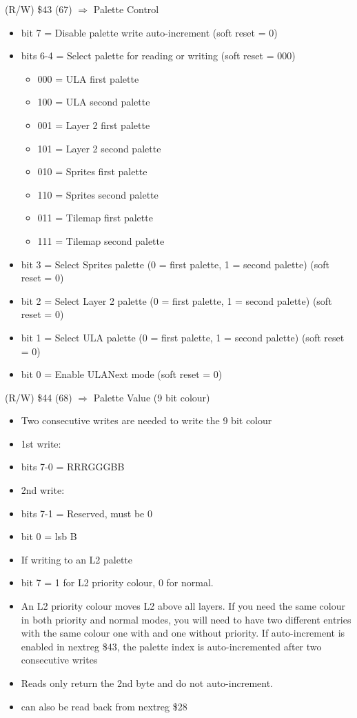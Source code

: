 (R/W) \$43 (67) $\Rightarrow$ Palette Control
\begin{itemize}
\item bit 7 = Disable palette write auto-increment (soft reset = 0)
\item bits 6-4 = Select palette for reading or writing (soft reset =
  000)
  \begin{itemize}
  \item 000 = ULA first palette
  \item 100 = ULA second palette
  \item 001 = Layer 2 first palette
  \item 101 = Layer 2 second palette
  \item 010 = Sprites first palette 
  \item 110 = Sprites second palette
  \item 011 = Tilemap first palette
  \item 111 = Tilemap second palette
  \end{itemize}
\item bit 3 = Select Sprites palette (0 = first palette, 1 = second
  palette) (soft reset = 0)
\item bit 2 = Select Layer 2 palette (0 = first palette, 1 = second
  palette) (soft reset = 0)
\item bit 1 = Select ULA palette (0 = first palette, 1 = second
  palette) (soft reset = 0)
\item bit 0 = Enable ULANext mode (soft reset = 0)
\end{itemize}

(R/W) \$44 (68) $\Rightarrow$ Palette Value (9 bit colour)
\begin{itemize}
\item[] Two consecutive writes are needed to write the 9 bit colour
\item[] 1st write:
\item bits 7-0 = RRRGGGBB
\item[] 2nd write:
\item bits 7-1 = Reserved, must be 0
\item bit 0 = lsb B
\item[] If writing to an L2 palette
\item bit 7 = 1 for L2 priority colour, 0 for normal.
\item[] An L2 priority colour moves L2 above all layers.  If you need
  the same colour in both priority and normal modes, you will need to
  have two different entries with the same colour one with and one
  without priority.  If auto-increment is enabled in nextreg \$43, the
  palette index is auto-incremented after two consecutive writes
\item[] Reads only return the 2nd byte and do not auto-increment.
\item[] can also be read back from nextreg \$28
\end{itemize}


